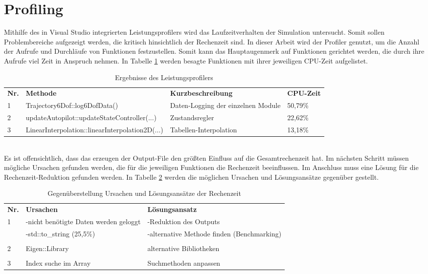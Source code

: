 \section{Profiling}
Mithilfe des in Visual Studio integrierten Leistungsprofilers  wird das Laufzeitverhalten der Simulation untersucht. Somit sollen Problembereiche aufgezeigt werden, die kritisch hinsichtlich der Rechenzeit sind. In dieser Arbeit wird der Profiler genutzt, um die Anzahl der Aufrufe und Durchläufe von Funktionen festzustellen. Somit kann das Hauptaugenmerk auf Funktionen gerichtet werden, die durch ihre Aufrufe viel Zeit in Anspruch nehmen. In Tabelle \ref{tab:.profiler} werden besagte Funktionen mit ihrer jeweiligen CPU-Zeit aufgelistet. 
\begin{table}[h]
	\centering\begin{tabular}{llp{5cm}l}
	\textbf{Nr.} &	\textbf{Methode} & \textbf{Kurzbeschreibung} &\textbf{CPU-Zeit}\\
	1&	Trajectory6Dof::log6DofData() & Daten-Logging der einzelnen Module&50,79\% \\
	2&	updateAutopilot::updateStateController(...) & Zustandsregler & 22,62\% \\
	3&	LinearInterpolation::linearInterpolation2D(...) & Tabellen-Interpolation & 13,18\%
	\end{tabular}
\caption{Ergebnisse des Leistungsprofilers}
\label{tab:.profiler}
\end{table}\noindent\\
Es ist offensichtlich, dass das erzeugen der Output-File den größten Einfluss auf die Gesamtrechenzeit hat. Im nächsten Schritt müssen mögliche Ursachen gefunden werden, die für die jeweiligen Funktionen die Rechenzeit beeinflussen. Im Anschluss muss eine Lösung für die Rechenzeit-Reduktion gefunden werden. In Tabelle \ref{tab:korrektur} werden die möglichen Ursachen und Lösungsansätze gegenüber gestellt.
\begin{table}[h]
	\centering\begin{tabular}{lp{6cm}p{4cm}}
		\textbf{Nr.} & \textbf{Ursachen} & \textbf{Lösungsansatz}\\
		1 & -nicht benötigte Daten werden geloggt & -Reduktion des Outputs \\
									  & -std::to\_string (25,5\%) & -alternative Methode finden (Benchmarking)\\
									  &&\\
		2 & Eigen::Library & alternative Bibliotheken \\	
									  &&\\
		3	& Index suche im Array & 	Suchmethoden anpassen		
	\end{tabular}
	\caption{Gegenüberstellung Ursachen und Lösungsansätze der Rechenzeit}
	\label{tab:korrektur}
\end{table}
